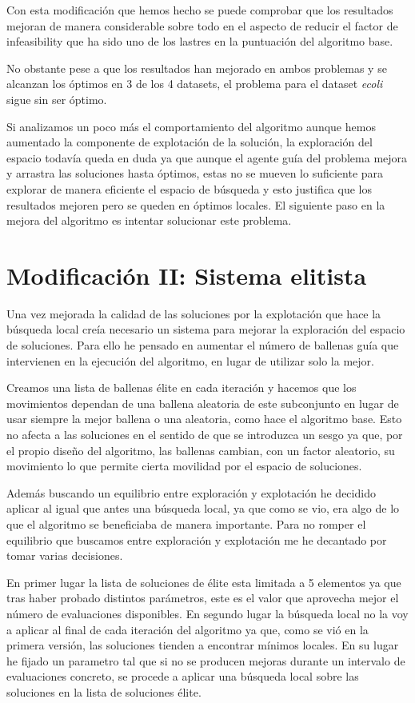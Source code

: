 \documentclass[11pt]{article}
\begin{document}
Con esta modificación que hemos hecho se puede comprobar que los resultados
mejoran de manera considerable sobre todo en el aspecto de reducir el factor de
infeasibility que ha sido uno de los lastres en la puntuación del algoritmo
base. 

No obstante pese a que los resultados han mejorado en ambos problemas y se
alcanzan los óptimos en 3 de los 4 datasets, el problema para el dataset
\textit{ecoli} sigue sin ser óptimo. 

Si analizamos un poco más el comportamiento del algoritmo aunque hemos aumentado
la componente de explotación de la solución, la exploración del espacio todavía
queda en duda ya que aunque el agente guía del problema mejora y arrastra las
soluciones hasta óptimos, estas no se mueven lo suficiente para explorar de
manera eficiente el espacio de búsqueda y esto justifica que los resultados
mejoren pero se queden en óptimos locales. El siguiente paso en la mejora del
algoritmo es intentar solucionar este problema.

\section{Modificación II: Sistema elitista}

Una vez mejorada la calidad de las soluciones por la explotación que hace la
búsqueda local creía necesario un sistema para mejorar la exploración del
espacio de soluciones. Para ello he pensado en aumentar el número de ballenas
guía que intervienen en la ejecución del algoritmo, en lugar de utilizar solo la
mejor. 

Creamos una lista de ballenas élite en cada iteración y hacemos que los
movimientos dependan de una ballena aleatoria de este subconjunto en lugar de
usar siempre la mejor ballena o una aleatoria, como hace el algoritmo base. Esto
no afecta a las soluciones en el sentido de que se introduzca un sesgo ya que,
por el propio diseño del algoritmo, las ballenas cambian, con un factor aleatorio,
su movimiento lo que permite cierta movilidad por el espacio de
soluciones.

Además buscando un equilibrio entre exploración y explotación he decidido
aplicar al igual que antes una búsqueda local, ya que como se vio, era algo de
lo que el algoritmo se beneficiaba de manera importante. Para no romper el
equilibrio que buscamos entre exploración y explotación me he decantado por 
tomar varias decisiones.

En primer lugar la lista de soluciones de élite esta limitada a 5 elementos ya
que tras haber probado distintos parámetros, este es el valor que aprovecha mejor
el número de evaluaciones disponibles. En segundo lugar la búsqueda local no la
voy a aplicar al final de cada iteración del algoritmo ya que, como se vió en la
primera versión, las soluciones tienden a encontrar mínimos locales. En su lugar
he fijado un parametro tal que si no se producen mejoras durante un intervalo de
evaluaciones concreto, se procede a aplicar una búsqueda local sobre las
soluciones en la lista de soluciones élite.
\end{document}
